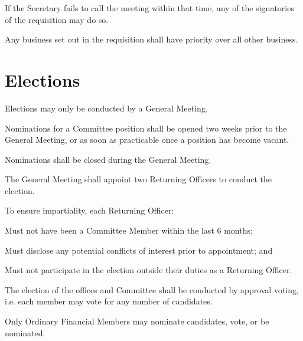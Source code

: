\documentclass[a4paper]{article}
\begin{document}
\begin{myEnumerate}
\begin{myEnumerate}
            \begin{myEnumerate}
                \item If the Secretary fails to call the meeting within that time, any of the signatories of the requisition may do so.
            \end{myEnumerate}
            \item \label{item:sgm_priority} Any business set out in the requisition shall have priority over all other business.
        \end{myEnumerate}
\end{myEnumerate}


\section{Elections} \label{sec:elections}
\begin{myEnumerate}
    \item Elections may only be conducted by a General Meeting.
    \item Nominations for a Committee position shall be opened two weeks prior to the General Meeting, or as soon as practicable once a position has become vacant.
    \item Nominations shall be closed during the General Meeting.
    \item The General Meeting shall appoint two Returning Officers to conduct the election.
    \begin{myEnumerate}
        \item To ensure impartiality, each Returning Officer:
        \begin{myEnumerate}
            \item Must not have been a Committee Member within the last 6 months;
            \item Must disclose any potential conflicts of interest prior to appointment; and
            \item Must not participate in the election outside their duties as a Returning Officer.
        \end{myEnumerate}
    \end{myEnumerate}
    \item The election of the offices and Committee shall be conducted by approval voting, i.e. each member may vote for any number of candidates.
    \item Only Ordinary Financial Members may nominate candidates, vote, or be nominated.
        \begin{myEnumerate}

\end{myEnumerate}
\end{myEnumerate}
\end{document}
